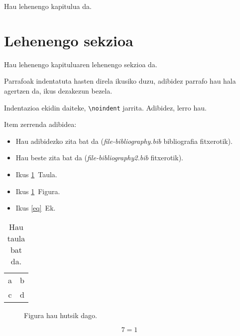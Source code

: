 
Hau lehenengo kapitulua da.

\section{Lehenengo sekzioa}

Hau lehenengo kapituluaren lehenengo sekzioa da.

Parrafoak indentatuta hasten direla ikusiko duzu, adibidez parrafo hau hala agertzen da, ikus dezakezun bezela.

\noindent Indentazioa ekidin daiteke, \verb#\noindent# jarrita. Adibidez, lerro hau.

\noindent Item zerrenda adibidea:

\begin{itemize}
 \item Hau adibidezko zita bat da\cite{yo:07} (\textit{file-bibliography.bib} bibliografia fitxerotik).
 \item Hau beste zita bat da\cite{yo:08} (\textit{file-bibliography2.bib} fitxerotik).
 \item Ikus \ref{tab}~Taula.
 \item Ikus \ref{fig}~Figura.
 \item Ikus \ref{eq}~Ek.
\end{itemize}

\begin{table}[hbt]
 \begin{center}
 \begin{tabular}{cc}
  a & b \\
  c & d 
 \end{tabular}
 \end{center}
 \caption{Hau taula bat da.}
 \label{tab}
\end{table}

\begin{figure}[hbt]
 \begin{center}
 \end{center}
 \caption{Figura hau hutsik dago.}
 \label{fig}
\end{figure}

\begin{equation}
  7 = 1
 \label{eq}
\end{equation}
